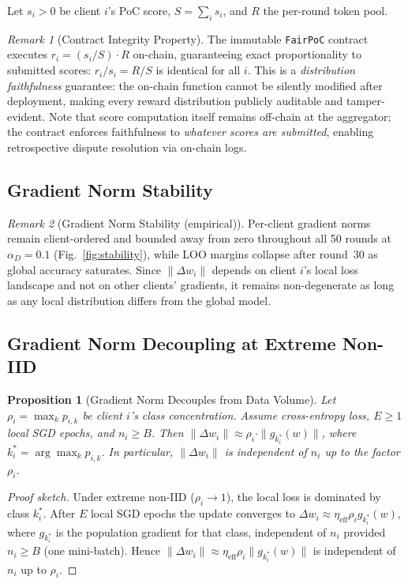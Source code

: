 \documentclass[conference]{IEEEtran}
\newtheorem{proposition}{Proposition}
\theoremstyle{remark}
\newtheorem{remark}{Remark}
\begin{document}
Let $s_i > 0$ be client $i$'s PoC score, $S = \sum_i s_i$, and $R$ the
per-round token pool.

\begin{remark}[Contract Integrity Property]
\label{rem:integrity}
The immutable \texttt{FairPoC} contract executes
$r_i = (s_i / S) \cdot R$ on-chain, guaranteeing exact proportionality
to submitted scores: $r_i / s_i = R/S$ is identical for all $i$.
This is a \emph{distribution faithfulness} guarantee: the on-chain
function cannot be silently modified after deployment, making every
reward distribution publicly auditable and tamper-evident.
Note that score computation itself remains off-chain at the aggregator;
the contract enforces faithfulness to \emph{whatever scores are
submitted}, enabling retrospective dispute resolution via on-chain logs.
\end{remark}

\subsection{Gradient Norm Stability}

\begin{remark}[Gradient Norm Stability (empirical)]
\label{rem:stability}
Per-client gradient norms remain client-ordered and bounded away from
zero throughout all 50 rounds at $\alpha_D = 0.1$
(Fig.~\ref{fig:stability}), while LOO margins collapse after round~30
as global accuracy saturates. Since $\|\Delta w_i\|$ depends on
client $i$'s local loss landscape and not on other clients' gradients,
it remains non-degenerate as long as any local distribution differs
from the global model.
\end{remark}

\subsection{Gradient Norm Decoupling at Extreme Non-IID}
\label{subsec:decoupling}

\begin{proposition}[Gradient Norm Decouples from Data Volume]
\label{prop:gradnorm_limit}
Let $\rho_i = \max_k p_{i,k}$ be client $i$'s class concentration.
Assume cross-entropy loss, $E \geq 1$ local SGD epochs, and $n_i \geq B$.
Then $\|\Delta w_i\| \approx \rho_i \cdot \|g_{k_i^*}(w)\|$,
where $k_i^* = \arg\max_k p_{i,k}$.
In particular, $\|\Delta w_i\|$ is independent of $n_i$ up to the
factor $\rho_i$.
\end{proposition}
\begin{proof}[Proof sketch]
Under extreme non-IID ($\rho_i \to 1$), the local loss is dominated
by class $k_i^*$. After $E$ local SGD epochs the update converges to
$\Delta w_i \approx \eta_{\mathrm{eff}}\rho_i g_{k_i^*}(w)$, where
$g_{k_i^*}$ is the population gradient for that class, independent of
$n_i$ provided $n_i \geq B$ (one mini-batch).
Hence $\|\Delta w_i\| \approx \eta_{\mathrm{eff}}\rho_i\|g_{k_i^*}(w)\|$
is independent of $n_i$ up to $\rho_i$.
\end{proof}
\end{document}
